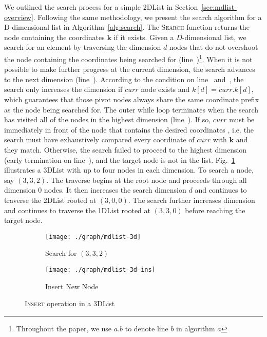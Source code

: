 \documentclass[10pt,journal,letterpaper,compsoc]{IEEEtran}
\begin{document}
We outlined the search process for a simple 2DList in Section~\ref{sec:mdlist-overview}.
Following the same methodology, we present the search algorithm for a D-dimensional list in Algorithm~\ref{alg:search}.
The \textsc{Search} function returns the node containing the coordinates $\mathbf{k}$ if it exists.  
Given a $D$-dimensional list, we search for an element by traversing the dimension $d$ nodes that do not overshoot the node containing the coordinates being searched for (line~)\footnote{Throughout the paper, we use $a.b$ to denote line $b$ in algorithm $a$}.
When it is not possible to make further progress at the current dimension, the search advances to the next dimension (line~).
According to the condition on line~ and~, the search only increases the dimension if $curr$ node exists and $k[d]=curr.k[d]$, which guarantees that those pivot nodes always share the same coordinate prefix as the node being searched for.
The outer while loop terminates when the search has visited all of the nodes in the highest dimension (line~).
If so, $curr$ must be immediately in front of the node that contains the desired coordinates , i.e. the search must have exhaustively compared every coordinate of $curr$ with $\mathbf{k}$ and they match.
Otherwise, the search failed to proceed to the highest dimension (early termination on line~), and the target node is not in the list.
Fig.~\ref{fig:mdlist3dsearch} illustrates a 3DList with up to four nodes in each dimension.
To search a node, say $(3,3,2)$.
The traverse begins at the root node and proceeds through all dimension 0 nodes.
It then increases the search dimension $d$ and continues to traverse the 2DList rooted at $(3,0,0)$.
The search further increases dimension and continues to traverse the 1DList rooted at $(3,3,0)$ before reaching the target node.
\begin{figure*}[t]
    \begin{subfigure}{0.47\textwidth}
        \centering
        \texttt{[image: ./graph/mdlist-3d]}
        \caption{Search for $(3,3,2)$}
        \label{fig:mdlist3dsearch}
    \end{subfigure}
    \hfill
    \begin{subfigure}{0.52\textwidth}
        \centering
        \texttt{[image: ./graph/mdlist-3d-ins]}
        \caption{Insert New Node}
        \label{fig:mdlist3dins}
    \end{subfigure}
    \caption{\textsc{Insert} operation in a 3DList}
    \label{fig:mdlist3d}
\end{figure*}
\end{document}

